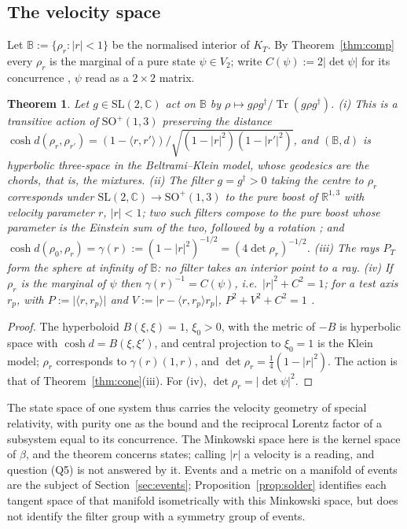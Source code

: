 \documentclass[aps,pra,onecolumn,superscriptaddress,nofootinbib,10pt]{revtex4-2}
\newtheorem{theorem}{Theorem}
\theoremstyle{definition}
\theoremstyle{remark}
\newcommand{\R}{\mathbb{R}}
\newcommand{\C}{\mathbb{C}}
\newcommand{\tr}{\operatorname{Tr}}
\newcommand{\ip}[2]{\langle #1,#2\rangle}
\newcommand{\SO}{\mathrm{SO}}
\newcommand{\SL}{\mathrm{SL}}
\begin{document}
\subsection{The velocity space}\label{sec:velocity}
Let $\mathbb B:=\{\rho_r:\lvert r\rvert<1\}$ be the normalised interior of $K_T$.  By
Theorem~\ref{thm:comp} every $\rho_r$ is the marginal of a pure state $\psi\in V_2$; write
$C(\psi):=2\lvert\det\psi\rvert$ for its concurrence \cite{Wootters}, $\psi$ read as a $2\times2$ matrix.

\begin{theorem}\label{thm:velocity}
Let $g\in\SL(2,\C)$ act on $\mathbb B$ by $\rho\mapsto g\rho g^\dagger/\tr(g\rho g^\dagger)$.
(i) This is a transitive action of $\SO^+(1,3)$ preserving the distance
$\cosh d(\rho_r,\rho_{r'})=(1-\ip{r}{r'})/\sqrt{(1-\lvert r\rvert^2)(1-\lvert r'\rvert^2)}$, and
$(\mathbb B,d)$ is hyperbolic three-space in the Beltrami--Klein model, whose geodesics are the chords,
that is, the mixtures.
(ii) The filter $g=g^\dagger>0$ taking the centre to $\rho_r$ corresponds under $\SL(2,\C)\to\SO^+(1,3)$
to the pure boost of $\R^{1,3}$ with velocity parameter $r$, $\lvert r\rvert<1$; two such filters compose
to the pure boost whose parameter is the Einstein sum of the two, followed by a rotation \cite{CU}; and $\cosh d(\rho_0,\rho_r)=\gamma(r):=(1-\lvert r\rvert^2)^{-1/2}
=(4\det\rho_r)^{-1/2}$.
(iii) The rays $P_T$ form the sphere at infinity of $\mathbb B$: no filter takes an interior point to a ray.
(iv) If $\rho_r$ is the marginal of $\psi$ then $\gamma(r)^{-1}=C(\psi)$, i.e.\ $\lvert r\rvert^2+C^2=1$;
for a test axis $r_p$, with $P:=\lvert\ip{r}{r_p}\rvert$ and $V:=\lvert r-\ip{r}{r_p}r_p\rvert$,
$P^2+V^2+C^2=1$ \cite{JB}.
\end{theorem}
\begin{proof}
The hyperboloid $B(\xi,\xi)=1$, $\xi_0>0$, with the metric of $-B$ is hyperbolic space with
$\cosh d=B(\xi,\xi')$, and central projection to $\xi_0=1$ is the Klein model; $\rho_r$ corresponds to
$\gamma(r)(1,r)$, and $\det\rho_r=\tfrac14(1-\lvert r\rvert^2)$.  The action is that of
Theorem~\ref{thm:cone}(iii).  For (iv), $\det\rho_r=\lvert\det\psi\rvert^2$.
\end{proof}
The state space of one system thus carries the velocity geometry of special relativity, with purity
one as the bound and the reciprocal Lorentz factor of a subsystem equal to its concurrence.  The
Minkowski space here is the kernel space of $\beta$, and the theorem concerns states; calling
$\lvert r\rvert$ a velocity is a reading, and question (Q5) is not answered by it.  Events and a metric on a manifold of events are the subject of
Section~\ref{sec:events}; Proposition~\ref{prop:solder} identifies each tangent space of that manifold
isometrically with this Minkowski space, but does not identify the filter group with a symmetry group
of events.
\end{document}
